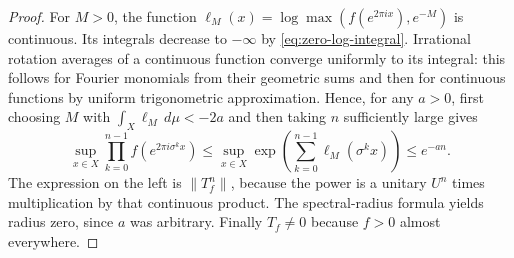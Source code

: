 \begin{proof}
For $M>0$, the function
$\ell_M(x)=\log\max(f(e^{2\pi i x}),e^{-M})$ is continuous.
Its integrals decrease to $-\infty$ by
\eqref{eq:zero-log-integral}.  Irrational rotation averages of a continuous
function converge uniformly to its integral: this follows for Fourier
monomials from their geometric sums and then for continuous functions by
uniform trigonometric approximation.  Hence, for any $a>0$, first choosing
$M$ with $\int_X\ell_M\,d\mu<-2a$ and then taking $n$ sufficiently large
gives
\[
 \sup_{x\in X}\prod_{k=0}^{n-1}f(e^{2\pi i\sigma^k x})
 \le\sup_{x\in X}\exp\left(\sum_{k=0}^{n-1}\ell_M(\sigma^k x)\right)
 \le e^{-an}.
\]
The expression on the left is $\|T_f^n\|$, because the power is a unitary
$U^n$ times multiplication by that continuous product.  The spectral-radius
formula yields radius zero, since $a$ was arbitrary.  Finally $T_f\ne0$
because $f>0$ almost everywhere.
\end{proof}
